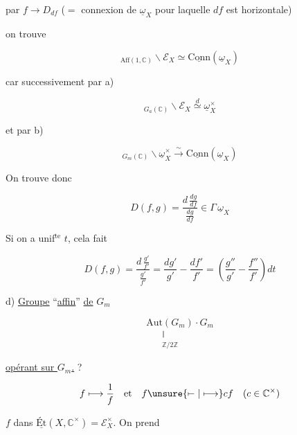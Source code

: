 

par $f\longrightarrow D_{df}$ ($=$ connexion de $\underline\omega_X$ pour laquelle  $df$ est horizontale)

on trouve

\[ {}_{\mathrm{Aff}(1,\mathbb C)}\backslash\mathscr E_X\simeq\underline{\mathrm{Conn}}(\underline\omega_X) \]

car successivement par a)

\[ {}_{G_a(\mathbb C)}\backslash\mathscr E_X\overset{d}{\simeq}\underline\omega_X^{\times} \]

et par b)

\[ {}_{G_m(\mathbb C)}\backslash\underline\omega_X^{\times}\xrightarrow{\sim}\underline{\mathrm{Conn}}(\underline\omega_X) \]

On trouve donc

\[ D(f,g)=\frac{d\,\frac{dg}{df}}{\frac{dg}{df}}\in\Gamma\,\underline\omega_X \]

Si on a unif$^{\mathrm{te}}$ $t$, cela fait

\[ D(f,g)=\frac{d\,\frac{g'}{f'}}{\frac{g'}{f'}}=\frac{dg'}{g'}-\frac{df'}{f'}=\left(\frac{g''}{g'}-\frac{f''}{f'}\right)dt \]


d)  \uline{Groupe} ``\uline{affin}'' \uline{de} $G_m$

\[ \underset{\substack{\Vert\\ \mathbb Z/2\mathbb Z}}{\mathrm{Aut}(G_m)}\cdot G_m \]

\uline{opérant sur $G_m$.} ?

\[ f\longmapsto\frac{1}{f}\quad\text{et}\quad f\unsure{\mapstochar\relbar|\longmapsto} c f\quad(c\in\mathbb C^{\times}) \]

$f$ dans $\underline{\mathrm{Ét}}(X,\mathbb C^{\times})=\mathscr E_X^{\times}$. On prend


